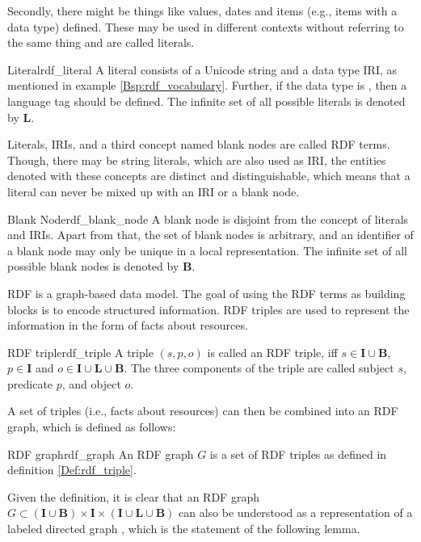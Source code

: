 Secondly, there might be things like values, dates and items (e.g., items with a data type) defined. These may be used in different contexts without referring to the same thing and are called literals.

\begin{Def}{Literal}{rdf_literal}
A literal consists of a Unicode string and a data type IRI, as mentioned in example \ref{Bsp:rdf_vocabulary}. Further, if the data type is , then a language tag should be defined.
The infinite set of all possible literals is denoted by $\mathbf{L}$.
\end{Def}

Literals, IRIs, and a third concept named blank nodes are called RDF terms.
Though, there may be string literals, which are also used as IRI, the entities denoted with these concepts are distinct and distinguishable, which means that a literal can never be mixed up with an IRI or a blank node.

\begin{Def}{Blank Node}{rdf_blank_node}
A blank node is disjoint from the concept of literals and IRIs. Apart from that, the set of blank nodes is arbitrary, and an identifier of a blank node may only be unique in a local representation.
The infinite set of all possible blank nodes is denoted by $\mathbf{B}$.
\end{Def}

RDF is a graph-based data model. The goal of using the RDF terms as building blocks is to encode structured information. RDF triples are used to represent the information in the form of facts about resources. 

\begin{Def}{RDF triple}{rdf_triple}
A triple $(s,p,o)$ is called an RDF triple, iff $s \in \mathbf{I} \cup \mathbf{B}$, $p \in \mathbf{I}$ and $o \in \mathbf{I} \cup \mathbf{L} \cup \mathbf{B}$.
The three components of the triple are called subject $s$, predicate $p$, and object $o$.
\end{Def}

A set of triples (i.e., facts about resources) can then be combined into an RDF graph, which is defined as follows:

\begin{Def}{RDF graph}{rdf_graph}
An RDF graph $G$ is a set of RDF triples as defined in definition \ref{Def:rdf_triple}.
\end{Def}

Given the definition, it is clear that an RDF graph $G \subset (\mathbf{I} \cup \mathbf{B}) \times \mathbf{I} \times (\mathbf{I} \cup \mathbf{L} \cup \mathbf{B})$ can also be understood as a representation of a labeled directed graph \cite{corman2019validating}, which is the statement of the following lemma.

